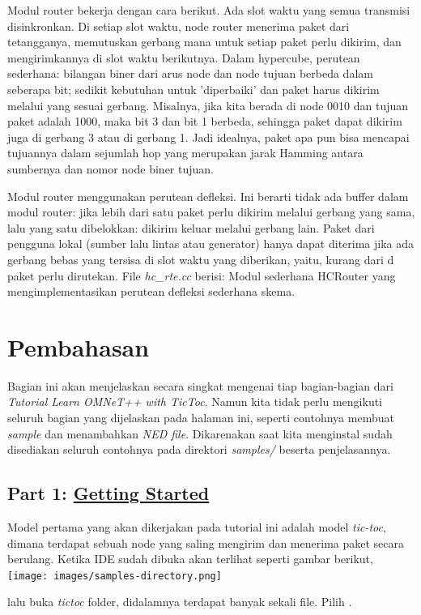 \documentclass[conference]{IEEEtran}
\begin{document}
Modul router bekerja dengan cara berikut. Ada slot waktu yang semua transmisi disinkronkan. Di setiap slot waktu, node router menerima paket dari tetangganya, memutuskan gerbang mana untuk setiap paket perlu dikirim, dan mengirimkannya di slot waktu berikutnya. Dalam hypercube, perutean sederhana: bilangan biner dari arus node dan node tujuan berbeda dalam  seberapa bit; sedikit kebutuhan untuk 'diperbaiki' dan paket harus dikirim melalui yang sesuai gerbang. Misalnya, jika kita berada di node 0010 dan tujuan paket adalah 1000, maka bit 3 dan bit 1 berbeda, sehingga paket dapat dikirim juga di gerbang 3 atau di gerbang 1. Jadi idealnya, paket apa pun bisa mencapai tujuannya dalam sejumlah hop yang merupakan jarak Hamming antara sumbernya dan nomor node biner tujuan. 

Modul router menggunakan perutean defleksi. Ini berarti tidak ada buffer dalam modul router: jika lebih dari satu paket perlu dikirim melalui gerbang yang sama, lalu yang satu dibelokkan: dikirim keluar melalui gerbang lain. Paket dari pengguna lokal (sumber lalu lintas atau generator) hanya dapat diterima jika ada gerbang bebas yang tersisa di slot waktu yang diberikan, yaitu, kurang dari d paket perlu dirutekan. File \textit{hc\_rte.cc} berisi: Modul sederhana HCRouter yang mengimplementasikan perutean defleksi sederhana skema. 

\section{Pembahasan}
Bagian ini akan menjelaskan secara singkat mengenai tiap bagian-bagian dari \textit{Tutorial Learn OMNeT++ with TicToc}. Namun kita tidak perlu mengikuti seluruh bagian yang dijelaskan pada halaman ini, seperti contohnya membuat \textit{sample} dan menambahkan \textit{NED file}. Dikarenakan saat kita menginstal sudah disediakan seluruh contohnya pada direktori \textit{samples/} beserta penjelasannya.

\subsection{Part 1: \href{https://docs.omnetpp.org/tutorials/tictoc/part1/}{Getting Started}}
Model pertama yang akan dikerjakan pada tutorial ini adalah model \textit{tic-toc}, dimana terdapat sebuah node yang saling mengirim dan menerima paket secara berulang. Ketika IDE sudah dibuka akan terlihat seperti gambar berikut,
\texttt{[image: images/samples-directory.png]}


lalu buka \textit{tictoc} folder, didalamnya terdapat banyak sekali file. Pilih .
\end{document}

